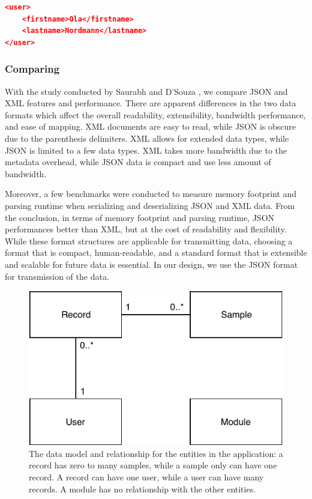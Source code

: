 \begin{lstlisting}[language=json, caption={}, captionpos=b]
<user>
    <firstname>Ola</firstname>
    <lastname>Nordmann</lastname>
</user>
\end{lstlisting}

\subsubsection{Comparing}
With the study conducted by Saurabh and D’Souza \cite{jsonvxml}, we compare JSON and XML features and performance. There are apparent differences in the two data formats which affect the overall readability, extensibility, bandwidth performance, and ease of mapping. XML documents are easy to read, while JSON is obscure due to the parenthesis delimiters. XML allows for extended data types, while JSON is limited to a few data types. XML takes more bandwidth due to the metadata overhead, while JSON data is compact and use less amount of bandwidth.

Moreover, a few benchmarks were conducted to measure memory footprint and parsing runtime when serializing and deserializing JSON and XML data. From the conclusion,  in terms of memory footprint and parsing runtime, JSON performances better than XML, but at the cost of readability and flexibility. While these format structures are applicable for transmitting data, choosing a format that is compact, human-readable, and a standard format that is extensible and scalable for future data is essential. In our design, we use the JSON format for transmission of the data.

\begin{figure}
    \centering
    \includegraphics[scale=0.8]{images/DataEntries.pdf}
    \caption{The data model and relationship for the entities in the application: a record has zero to many samples, while a sample only can have one record. A record can have one user, while a user can have many records. A module has no relationship with the other entities.}
    \label{fig:dataentries}
\end{figure}

